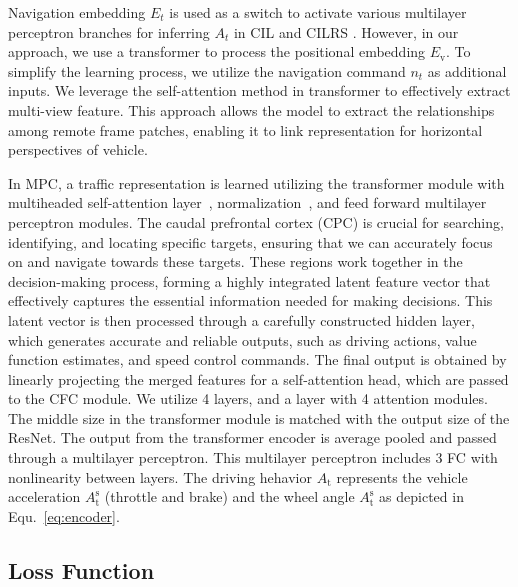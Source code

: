 Navigation embedding $E_{t}$ is used as a switch to activate various multilayer perceptron branches for inferring $A_{t}$ in CIL \cite{Codevilla:2018} and CILRS \cite{Codevilla:2019}. 
However, in our approach, we use a transformer to process the positional embedding $ E_\text{v} $.
To simplify the learning process, we utilize the navigation command $n_{t}$ as additional inputs.
%
We leverage the self-attention method in transformer to effectively extract multi-view feature\cite{Vaswani:2017}.
This approach allows the model to extract the relationships among remote frame patches, enabling it to link representation for horizontal perspectives of vehicle.


In MPC, a traffic representation is learned utilizing the transformer module with multiheaded self-attention layer~\cite{Vaswani:2017}, normalization~\cite{Ba:2016}, and feed forward multilayer perceptron modules. 
The caudal prefrontal cortex (CPC) is crucial for searching, identifying, and locating specific targets, ensuring that we can accurately focus on and navigate towards these targets. 
These regions work together in the decision-making process, forming a highly integrated latent feature vector that effectively captures the essential information needed for making decisions. 
This latent vector is then processed through a carefully constructed hidden layer, which generates accurate and reliable outputs, such as driving actions, value function estimates, and speed control commands.
The final output is obtained by linearly projecting the merged features for a self-attention head, which are passed to the CFC module.
We utilize 4 layers, and a layer with 4 attention modules. 
The middle size in the transformer module is matched with the output size of the ResNet.
%
The output from the transformer encoder is average pooled and passed through a multilayer perceptron.
This multilayer perceptron includes 3 FC with nonlinearity between layers.
The driving hehavior $A_\text{t}$ represents the vehicle acceleration $A_\text{t}^\text{s}$ (throttle and brake) and the wheel angle $A_\text{t}^\text{s}$ as depicted in Equ.~\ref{eq:encoder}. 





\subsection{Loss Function}

